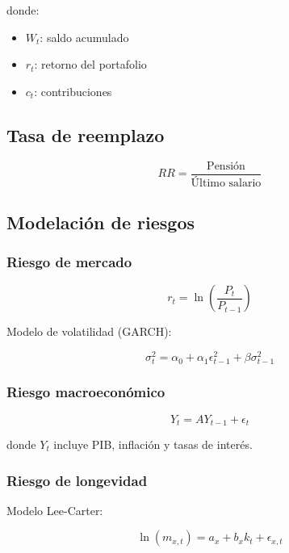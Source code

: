 \documentclass[12pt]{article}
\begin{document}
donde:
\begin{itemize}
\item $W_t$: saldo acumulado
\item $r_t$: retorno del portafolio
\item $c_t$: contribuciones
\end{itemize}

\subsection{Tasa de reemplazo}

\begin{equation}
RR = \frac{\text{Pensión}}{\text{Último salario}}
\end{equation}

\subsection{Modelación de riesgos}

\subsubsection{Riesgo de mercado}

\begin{equation}
r_t = \ln\left(\frac{P_t}{P_{t-1}}\right)
\end{equation}

Modelo de volatilidad (GARCH):

\begin{equation}
\sigma_t^2 = \alpha_0 + \alpha_1 \epsilon_{t-1}^2 + \beta \sigma_{t-1}^2
\end{equation}

\subsubsection{Riesgo macroeconómico}

\begin{equation}
Y_t = A Y_{t-1} + \epsilon_t
\end{equation}

donde $Y_t$ incluye PIB, inflación y tasas de interés.

\subsubsection{Riesgo de longevidad}

Modelo Lee-Carter:

\begin{equation}
\ln(m_{x,t}) = a_x + b_x k_t + \epsilon_{x,t}
\end{equation}
\end{document}

